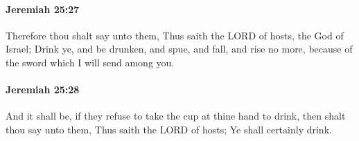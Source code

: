 		\paragraph{Jeremiah 25:27} %
			\label{JEREMIAH-25-27}

			Therefore thou shalt say unto them, Thus saith the LORD of hosts, the God of Israel; Drink ye, and be drunken, and spue, and fall, and rise no more, because of the sword which I will send among you.


		\paragraph{Jeremiah 25:28} %
			\label{JEREMIAH-25-28}

			And it shall be, if they refuse to take the cup at thine hand to drink, then shalt thou say unto them, Thus saith the LORD of hosts; Ye shall certainly drink.



